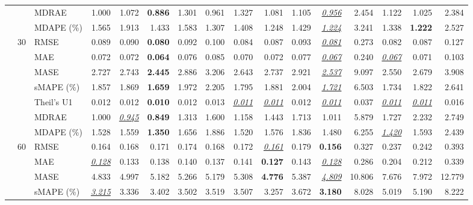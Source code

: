 \begin{table}[!htbp]
{\begin{tabular}{lllrrrrrrrrrrrrr}
 &  & MDRAE & 1.000 & 1.072 & \textbf{0.886} & 1.301 & 0.961 & 1.327 & 1.081 & 1.105 & \underline{\textit{0.956}} & 2.454 & 1.122 & 1.025 & 2.384 \\
 &  & MDAPE (\%) & 1.565 & 1.913 & 1.433 & 1.583 & 1.307 & 1.408 & 1.248 & 1.429 & \underline{\textit{1.224}} & 3.241 & 1.338 & \textbf{1.222} & 2.527 \\
\cmidrule(lr){2-16}
 & 30 & RMSE & 0.089 & 0.090 & \textbf{0.080} & 0.092 & 0.100 & 0.084 & 0.087 & 0.093 & \underline{\textit{0.081}} & 0.273 & 0.082 & 0.087 & 0.127 \\
 &  & MAE & 0.072 & 0.072 & \textbf{0.064} & 0.076 & 0.085 & 0.070 & 0.072 & 0.077 & \underline{\textit{0.067}} & 0.240 & \underline{\textit{0.067}} & 0.071 & 0.103 \\
 &  & MASE & 2.727 & 2.743 & \textbf{2.445} & 2.886 & 3.206 & 2.643 & 2.737 & 2.921 & \underline{\textit{2.537}} & 9.097 & 2.550 & 2.679 & 3.908 \\
 &  & sMAPE (\%) & 1.857 & 1.869 & \textbf{1.659} & 1.972 & 2.205 & 1.795 & 1.881 & 2.004 & \underline{\textit{1.721}} & 6.503 & 1.734 & 1.822 & 2.641 \\
 &  & Theil's U1 & 0.012 & 0.012 & \textbf{0.010} & 0.012 & 0.013 & \underline{\textit{0.011}} & \underline{\textit{0.011}} & 0.012 & \underline{\textit{0.011}} & 0.037 & \underline{\textit{0.011}} & \underline{\textit{0.011}} & 0.016 \\
 &  & MDRAE & 1.000 & \underline{\textit{0.945}} & \textbf{0.849} & 1.313 & 1.600 & 1.158 & 1.443 & 1.713 & 1.011 & 5.879 & 1.727 & 2.232 & 2.749 \\
 &  & MDAPE (\%) & 1.528 & 1.559 & \textbf{1.350} & 1.656 & 1.886 & 1.520 & 1.576 & 1.836 & 1.480 & 6.255 & \underline{\textit{1.420}} & 1.593 & 2.439 \\
\cmidrule(lr){2-16}
 & 60 & RMSE & 0.164 & 0.168 & 0.171 & 0.174 & 0.168 & 0.172 & \underline{\textit{0.161}} & 0.179 & \textbf{0.156} & 0.327 & 0.237 & 0.242 & 0.393 \\
 &  & MAE & \underline{\textit{0.128}} & 0.133 & 0.138 & 0.140 & 0.137 & 0.141 & \textbf{0.127} & 0.143 & \underline{\textit{0.128}} & 0.286 & 0.204 & 0.212 & 0.339 \\
 &  & MASE & 4.833 & 4.997 & 5.182 & 5.266 & 5.179 & 5.308 & \textbf{4.776} & 5.387 & \underline{\textit{4.809}} & 10.806 & 7.676 & 7.972 & 12.779 \\
 &  & sMAPE (\%) & \underline{\textit{3.215}} & 3.336 & 3.402 & 3.502 & 3.519 & 3.507 & 3.257 & 3.672 & \textbf{3.180} & 8.028 & 5.019 & 5.190 & 8.222 \\

\end{tabular}}
\end{table}

